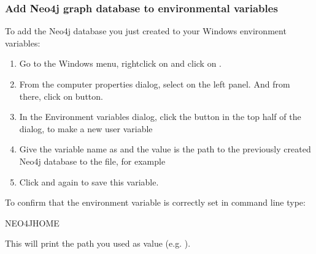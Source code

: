\documentclass[letterpaper,10pt,english]{sphinxmanual}
\begin{document}
\subsubsection{Add Neo4j graph database to environmental variables}
\label{\detokenize{intro/getting-started-with-windows:add-neo4j-graph-database-to-environmental-variables}}\label{\detokenize{intro/getting-started-with-windows:id1}}
To add the Neo4j database you just created to your Windows environment variables:
\begin{enumerate}
%
\item {} 
Go to the Windows menu, right\sphinxhyphen{}click on  and click on .

\item {} 
From the computer properties dialog, select  on the left panel. And from there, click on  button.

\item {} 
In the Environment variables dialog, click the  button in the top half of the dialog, to make a new user variable

\item {} 
Give the variable name as  and the value is the path to the previously created Neo4j database to the file, for example 

\item {} 
Click  and  again to save this variable.

\end{enumerate}

To confirm that the environment variable is correctly set in command line type:

\begin{sphinxVerbatim}[commandchars=\\\{\}]
\PYGZgt{}  \PYGZpc{}NEO4J\PYGZus{}HOME\PYGZpc{}
\end{sphinxVerbatim}

This will print the path you used as value (e.g. ).
\end{document}
